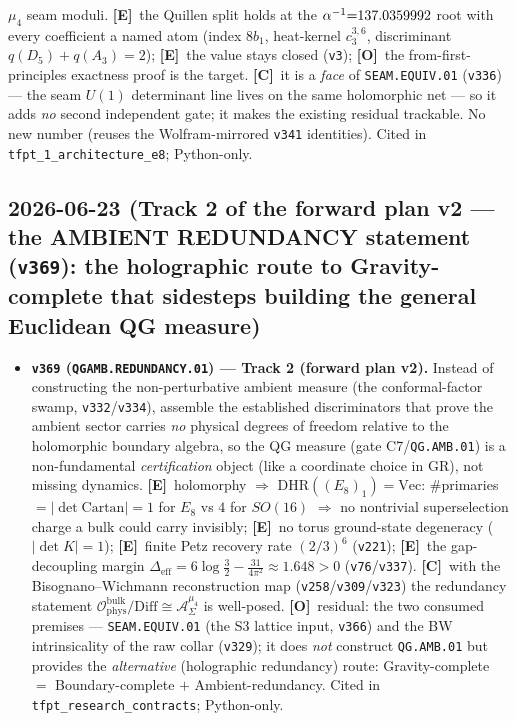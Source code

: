 \documentclass[11pt]{article}
\providecommand{\mE}{\textbf{[E]}}\providecommand{\mC}{\textbf{[C]}}
\providecommand{\mO}{\textbf{[O]}}\providecommand{\mX}{\textbf{[X]}}
\providecommand{\vref}[1]{\texttt{#1}}
\providecommand{\cthree}{c_3}\providecommand{\phiz}{\varphi_0^{\mathrm{ret}}}
\begin{document}
\begin{itemize}
$\mu_4$ seam moduli. \mE\ the Quillen split holds at the $\alpha^{-1}{=}137.0359992$ root with every coefficient a named
atom (index $8b_1$, heat-kernel $\cthree^{3,6}$, discriminant $q(D_5){+}q(A_3){=}2$); \mE\ the value stays closed
(\vref{v3}); \mO\ the from-first-principles exactness proof is the target. \mC\ it is a \emph{face} of
\texttt{SEAM.EQUIV.01} (\vref{v336}) --- the seam $U(1)$ determinant line lives on the same holomorphic net --- so it
adds \emph{no} second independent gate; it makes the existing residual trackable. No new number (reuses the
Wolfram-mirrored \vref{v341} identities). Cited in \texttt{tfpt\_1\_architecture\_e8}; Python-only.
\end{itemize}

\subsection*{2026-06-23 (Track 2 of the forward plan v2 --- the AMBIENT REDUNDANCY statement (\texttt{v369}): the holographic route to Gravity-complete that sidesteps building the general Euclidean QG measure)}
\begin{itemize}
\item \textbf{\texttt{v369} (\texttt{QGAMB.REDUNDANCY.01}) --- Track 2 (forward plan v2).} Instead of
constructing the non-perturbative ambient measure (the conformal-factor swamp, \vref{v332}/\vref{v334}), assemble
the established discriminators that prove the ambient sector carries \emph{no} physical degrees of freedom relative
to the holomorphic boundary algebra, so the QG measure (gate C7/\texttt{QG.AMB.01}) is a non-fundamental
\emph{certification} object (like a coordinate choice in GR), not missing dynamics. \mE\ holomorphy
$\Rightarrow$ $\mathrm{DHR}((E_8)_1)=\mathrm{Vec}$: $\#$primaries $=|\det\mathrm{Cartan}|=1$ for $E_8$ vs $4$ for
$SO(16)$ $\Rightarrow$ no nontrivial superselection charge a bulk could carry invisibly; \mE\ no torus
ground-state degeneracy ($|\det K|=1$); \mE\ finite Petz recovery rate $(2/3)^6$ (\vref{v221}); \mE\ the
gap-decoupling margin $\Delta_{\mathrm{eff}}=6\log\tfrac32-\tfrac{31}{4\pi^2}\approx1.648>0$ (\vref{v76}/\vref{v337}).
\mC\ with the Bisognano--Wichmann reconstruction map (\vref{v258}/\vref{v309}/\vref{v323}) the redundancy statement
$\mathcal O_{\mathrm{phys}}^{\mathrm{bulk}}/\mathrm{Diff}\cong\mathcal A_\Sigma^{\mu_4}$ is well-posed. \mO\ residual:
the two consumed premises --- \texttt{SEAM.EQUIV.01} (the S3 lattice input, \vref{v366}) and the BW intrinsicality
of the raw collar (\vref{v329}); it does \emph{not} construct \texttt{QG.AMB.01} but provides the
\emph{alternative} (holographic redundancy) route: Gravity-complete $=$ Boundary-complete $+$ Ambient-redundancy.
Cited in \texttt{tfpt\_research\_contracts}; Python-only.
\end{itemize}
\end{document}
